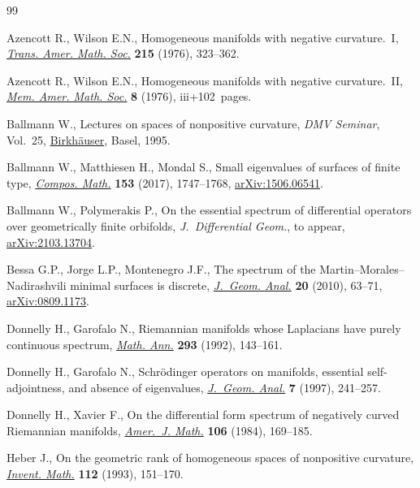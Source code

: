 \documentclass[10pt,a4paper]{amsart}
\numberwithin{equation}{section}
\begin{document}
\begin{thebibliography}{99}
\footnotesize\itemsep=0pt

Azencott R., Wilson E.N., Homogeneous manifolds with negative curvature.~{I},
 \href{https://doi.org/10.2307/1999731}{\textit{Trans. Amer. Math. Soc.}} \textbf{215} (1976), 323--362.

Azencott R., Wilson E.N., Homogeneous manifolds with negative curvature.~{II},
 \href{https://doi.org/10.1090/memo/0178}{\textit{Mem. Amer. Math. Soc.}} \textbf{8} (1976), iii+102~pages.

Ballmann W., Lectures on spaces of nonpositive curvature, \textit{DMV Seminar},
 Vol.~25, \href{https://doi.org/10.1007/978-3-0348-9240-7}{{Birkh\"auser}}, Basel, 1995.

Ballmann W., Matthiesen H., Mondal S., Small eigenvalues of surfaces of finite
 type, \href{https://doi.org/10.1112/S0010437X17007291}{\textit{Compos. Math.}} \textbf{153} (2017), 1747--1768,
 \href{https://arxiv.org/abs/1506.06541}{arXiv:1506.06541}.

Ballmann W., Polymerakis P., On the essential spectrum of differential
 operators over geometrically finite orbifolds, \textit{J.~Differential Geom.},
 {t}o appear, \href{https://arxiv.org/abs/2103.13704}{arXiv:2103.13704}.

Bessa G.P., Jorge L.P., Montenegro J.F., The spectrum of the
 {M}artin--{M}orales--{N}adirashvili minimal surfaces is discrete,
 \href{https://doi.org/10.1007/s12220-009-9101-z}{\textit{J.~Geom. Anal.}} \textbf{20} (2010), 63--71, \href{https://arxiv.org/abs/0809.1173}{arXiv:0809.1173}.

Donnelly H., Garofalo N., Riemannian manifolds whose {L}aplacians have purely
 continuous spectrum, \href{https://doi.org/10.1007/BF01444709}{\textit{Math. Ann.}} \textbf{293} (1992), 143--161.

Donnelly H., Garofalo N., Schr\"odinger operators on manifolds, essential
 self-adjointness, and absence of eigenvalues, \href{https://doi.org/10.1007/BF02921722}{\textit{J.~Geom. Anal.}}
 \textbf{7} (1997), 241--257.

Donnelly H., Xavier F., On the differential form spectrum of negatively curved
 {R}iemannian manifolds, \href{https://doi.org/10.2307/2374434}{\textit{Amer.~J. Math.}} \textbf{106} (1984),
 169--185.

Heber J., On the geometric rank of homogeneous spaces of nonpositive curvature,
 \href{https://doi.org/10.1007/BF01232428}{\textit{Invent. Math.}} \textbf{112} (1993), 151--170.


\end{thebibliography}
\end{document}
